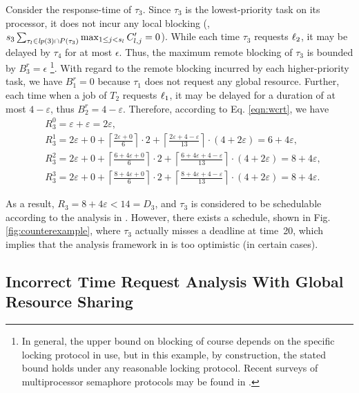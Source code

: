 Consider the response-time of $\tau_3$. Since $\tau_3$ is the lowest-priority task on its processor, it does not incur any local blocking (\ie,$s_3 \sum_{\tau_l \in \mathit{lp}(3) \cap P(\tau_3)} \max_{1 \leq j < s_l} C_{l,j}^{\prime} = 0$). While each time $\tau_3$ requests $\ell_2$, it may be delayed by $\tau_4$ for at most $\epsilon$. Thus, the maximum remote blocking of $\tau_3$ is bounded by $B_3^r = \epsilon$ \footnote{In general, the upper bound on blocking of course depends on the specific locking protocol in use, but in this example, by construction, the stated bound holds under any reasonable locking protocol. Recent surveys of multiprocessor semaphore protocols may be found in \cite{bbb-2013,yang-2015}.}. With regard to the remote blocking incurred by each higher-priority task, we have $B_1^r = 0$ because $\tau_1$ does not request any global resource. Further, each time when a job of $T_2$ requests $\ell_1$, it may be delayed for a duration of at most $4-\varepsilon$, thus $B_2^r = 4-\varepsilon$. Therefore, according to Eq. \ref{eqn:wcrt}, we have
\begin{align*}
& R_3^0 = \varepsilon + \varepsilon = 2\varepsilon, \\
& R_3^1 = 2\varepsilon + 0 + \left \lceil \frac{2\varepsilon + 0}{6} \right \rceil \cdot 2 + \left \lceil \frac{2\varepsilon + 4 - \varepsilon}{13} \right \rceil \cdot (4+2\varepsilon) =  6+4\varepsilon, \\
& R_3^2 = 2\varepsilon + 0 + \left \lceil \frac{6+4\varepsilon + 0}{6} \right \rceil \cdot 2 + \left \lceil \frac{6+4\varepsilon + 4-\varepsilon}{13} \right \rceil \cdot (4+2\varepsilon) = 8+4\varepsilon, \\
& R_3^3 = 2\varepsilon + 0 + \left \lceil \frac{8+4\varepsilon + 0}{6} \right \rceil \cdot 2 + \left \lceil \frac{8+4\varepsilon + 4-\varepsilon}{13} \right \rceil \cdot (4+2\varepsilon) = 8+4\varepsilon.
\end{align*}
 
As a result, $R_3 = 8+4\varepsilon < 14 = D_3$, and $\tau_3$ is considered to be schedulable according to the analysis in \cite{lakshmanan-2009}. However, there exists a schedule, shown in Fig. \ref{fig:counterexample}, where $\tau_3$  actually misses a deadline at time~20, which implies that the analysis framework in \cite{lakshmanan-2009} is too optimistic (in certain cases). 

\subsection{Incorrect Time Request Analysis With Global Resource Sharing}

